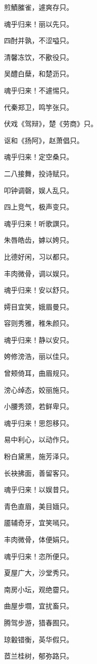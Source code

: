 \documentclass[12pt,a4paper]{ctexbook}
\begin{document}
煎鰿膗雀，遽爽存只。\par
魂乎归来！丽以先只。\par
四酎并孰，不涩嗌只。\par
清馨冻饮，不歠役只。\par
吴醴白蘖，和楚沥只。\par
魂乎归来！不遽惕只。\par
代秦郑卫，鸣竽张只。\par
伏戏《驾辩》，楚《劳商》只。\par
讴和《扬阿》，赵萧倡只。\par
魂乎归来！定空桑只。\par
二八接舞，投诗赋只。\par
叩钟调磬，娱人乱只。\par
四上竞气，极声变只。\par
魂乎归来！听歌譔只。\par
朱唇皓齿，嫭以姱只。\par
比德好闲，习以都只。\par
丰肉微骨，调以娱只。\par
魂乎归来！安以舒只。\par
嫮目宜笑，娥眉曼只。\par
容则秀雅，稚朱颜只。\par
魂乎归来！静以安只。\par
姱修滂浩，丽以佳只。\par
曾颊倚耳，曲眉规只。\par
滂心绰态，姣丽施只。\par
小腰秀颈，若鲜卑只。\par
魂乎归来！思怨移只。\par
易中利心，以动作只。\par
粉白黛黑，施芳泽只。\par
长袂拂面，善留客只。\par
魂乎归来！以娱昔只。\par
青色直眉，美目媔只。\par
靥辅奇牙，宜笑嘕只。\par
丰肉微骨，体便娟只。\par
魂乎归来！恣所便只。\par
夏屋广大，沙堂秀只。\par
南房小坛，观绝霤只。\par
曲屋步壛，宜扰畜只。\par
腾驾步游，猎春囿只。\par
琼轂错衡，英华假只。\par
茝兰桂树，郁弥路只。\par
\end{document}
